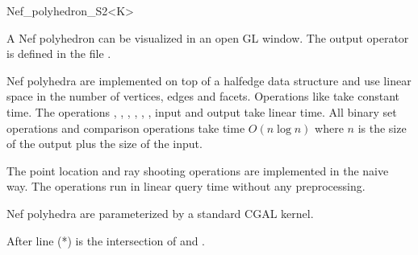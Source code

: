 \begin{ccRefClass}{Nef_polyhedron_S2<K>}

 A Nef polyhedron  can be
visualized in an open GL window. The output operator is defined in the
file .
   
\ccImplementation

Nef polyhedra are implemented on top of a halfedge data structure and
use linear space in the number of vertices, edges and facets.
Operations like  take constant time. The operations
, , , ,
, , input and output take linear
time. All binary set operations and comparison operations take time
$O(n \log n)$ where $n$ is the size of the output plus the size of the
input.

The point location and ray shooting operations are implemented in the
naive way. The operations run in linear query time without any
preprocessing.

\ccExample

Nef polyhedra are parameterized by a standard CGAL kernel.


After line (*)  is the intersection of  and . 

\end{ccRefClass}


